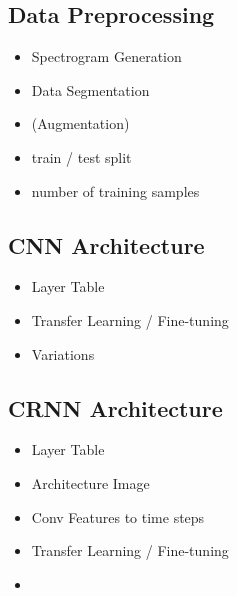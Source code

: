 \subsection{Data Preprocessing}
\label{sec:data_processing}

	

    \begin{itemize}
        \item Spectrogram Generation
        \item Data Segmentation
        \item (Augmentation)
        \item train / test split
		\item number of training samples
    \end{itemize}

\subsection{CNN Architecture}

    \begin{itemize}
        \item Layer Table
        \item Transfer Learning / Fine-tuning
        \item Variations
    \end{itemize}

\subsection{CRNN Architecture}

    \begin{itemize}
        \item Layer Table
        \item Architecture Image
        \item Conv Features to time steps
        \item Transfer Learning / Fine-tuning
        \item 
    \end{itemize}
